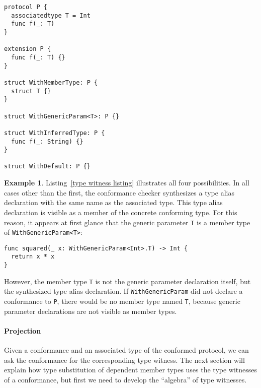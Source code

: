 \documentclass[a4paper,headsepline,bibliography=totoc,toc=flat,fleqn,twoside=semi]{scrbook}
\theoremstyle{definition}
\theoremstyle{definition}
\newtheorem{example}{Example}[chapter]
\theoremstyle{definition}
\begin{document}
\begin{listing}\label{type witness listing}
\begin{Verbatim}
protocol P {
  associatedtype T = Int
  func f(_: T)
}

extension P {
  func f(_: T) {}
}

struct WithMemberType: P {
  struct T {}
}

struct WithGenericParam<T>: P {}

struct WithInferredType: P {
  func f(_: String) {}
}

struct WithDefault: P {}
\end{Verbatim}
\end{listing}

\begin{example}
Listing~\ref{type witness listing} illustrates all four possibilities. In all cases other than the first, the conformance checker synthesizes a type alias declaration with the same name as the associated type. This type alias declaration is visible as a member of the concrete conforming type. For this reason, it appears at first glance that the generic parameter \texttt{T} is a member type of \texttt{WithGenericParam<T>}:
\begin{Verbatim}
func squared(_ x: WithGenericParam<Int>.T) -> Int {
  return x * x
}
\end{Verbatim}
However, the member type \texttt{T} is not the generic parameter declaration itself, but the synthesized type alias declaration. If \texttt{WithGenericParam} did not declare a conformance to \texttt{P}, there would be no member type named \texttt{T}, because generic parameter declarations are not visible as member types.
\end{example}

\paragraph{Projection}
Given a conformance and an associated type of the conformed protocol, we can ask the conformance for the corresponding type witness. The next section will explain how type substitution of dependent member types uses the type witnesses of a conformance, but first we need to develop the ``algebra'' of type witnesses.
\end{document}
